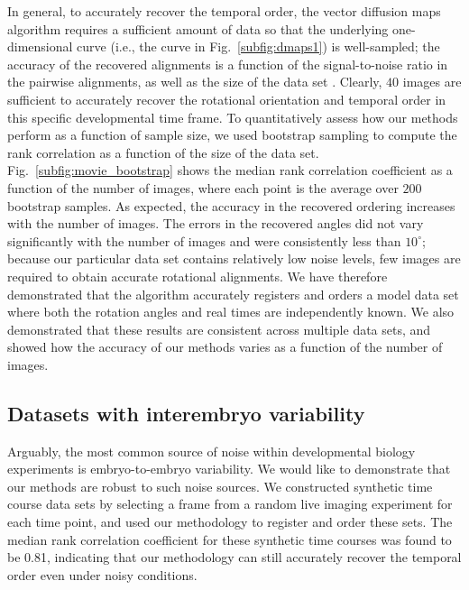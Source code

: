 \documentclass{pnastwo}
\newcommand{\fig}[0]{Fig.}
\begin{document}
\begin{article}
In general, to accurately recover the temporal order, the vector diffusion maps algorithm requires a sufficient amount of data so that the underlying one-dimensional curve (i.e., the curve in \fig~\ref{subfig:dmaps1}) is well-sampled;
the accuracy of the recovered alignments is a function of the signal-to-noise ratio in the pairwise alignments, as well as the size of the data set \cite{singer2011angular}.
%
Clearly, $40$ images are sufficient to accurately recover the rotational orientation and temporal order  in this specific developmental time frame.
%
To quantitatively assess how our methods perform as a function of sample size, we used bootstrap sampling to compute the rank correlation as a function of the size of the data set.
%
\fig~\ref{subfig:movie_bootstrap} shows the median rank correlation coefficient as a function of the number of images, where each point is the average over $200$ bootstrap samples.
%
As expected, the accuracy in the recovered ordering increases with the number of images. 
%
The errors in the recovered angles did not vary significantly with the number of images and were consistently less than $10^{\circ}$;
because our particular data set contains relatively low noise levels, few images are required to obtain accurate rotational alignments. 
%
We have therefore demonstrated that the algorithm accurately registers and orders a model data set where both the rotation angles and real times are independently known. 
%
We also demonstrated that these results are consistent across multiple data sets, and showed how the accuracy of our methods varies as a function of the number of images.


\subsection{Datasets with interembryo variability}

Arguably, the most common source of noise within developmental biology experiments is embryo-to-embryo variability. 
%
We would like to demonstrate that our methods are robust to such noise sources. 
%
We constructed synthetic time course data sets by selecting a frame from a random live imaging experiment for each time point, and used our methodology to register and order these sets. 
% 
The median rank correlation coefficient for these synthetic time courses was found to be 0.81, indicating that our methodology can still accurately recover the temporal order even under noisy conditions. 


\end{article}
\end{document}
